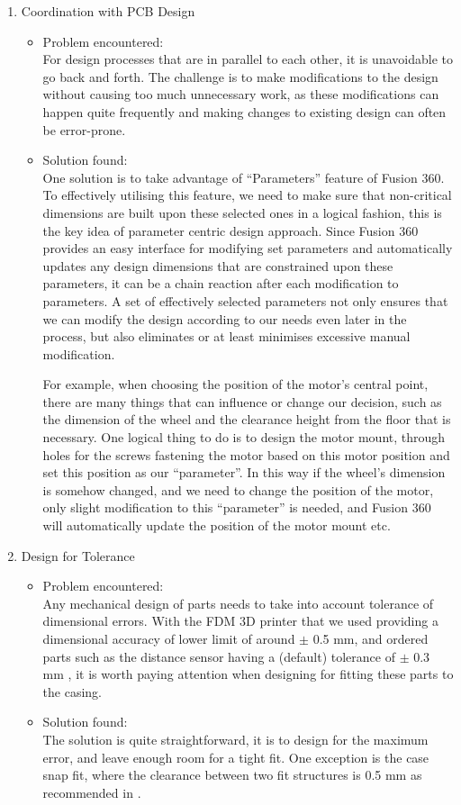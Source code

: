 \begin{enumerate}
  \item Coordination with PCB Design
  \begin{itemize}
      \item Problem encountered:\\
      For design processes that are in parallel to each other, it is unavoidable to go back and forth. The challenge is to make modifications to the design without causing too much unnecessary work, as these modifications can happen quite frequently and making changes to existing design can often be error-prone.
      \item Solution found:\\
      One solution is to take advantage of “Parameters” feature of Fusion 360. To effectively utilising this feature, we need to make sure that non-critical dimensions are built upon these selected ones in a logical fashion, this is the key idea of parameter centric design approach. Since Fusion 360 provides an easy interface for modifying set parameters and automatically updates any design dimensions that are constrained upon these parameters, it can be a chain reaction after each modification to parameters. A set of effectively selected parameters not only ensures that we can modify the design according to our needs even later in the process, but also eliminates or at least minimises excessive manual modification.
      
      For example, when choosing the position of the motor’s central point, there are many things that can influence or change our decision, such as the dimension of the wheel and the clearance height from the floor that is necessary. One logical thing to do is to design the motor mount, through holes for the screws fastening the motor based on this motor position and set this position as our “parameter”. In this way if the wheel’s dimension is somehow changed, and we need to change the position of the motor, only slight modification to this “parameter” is needed, and Fusion 360 will automatically update the position of the motor mount etc.
  \end{itemize}
  \item Design for Tolerance
  \begin{itemize}
      \item Problem encountered:\\
      Any mechanical design of parts needs to take into account tolerance of dimensional errors. With the FDM 3D printer that we used providing a dimensional accuracy of lower limit of around $\pm$ 0.5 mm, and ordered parts such as the distance sensor having a (default) tolerance of $\pm$ 0.3 mm \cite{sens}, it is worth paying attention when designing for fitting these parts to the casing.
      \item Solution found:\\
      The solution is quite straightforward, it is to design for the maximum error, and leave enough room for a tight fit. One exception is the case snap fit, where the clearance between two fit structures is 0.5 mm as recommended in \cite{low}.
      

\end{itemize}
\end{enumerate}
